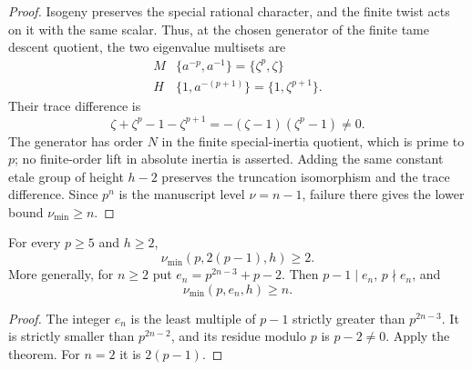 \begin{proof}
Isogeny preserves the special rational character, and the finite
twist acts on it with the same scalar.  Thus, at the chosen generator
of the finite tame descent quotient, the two eigenvalue multisets are
\[
 \begin{array}{c|c}
 M&\{a^{-p},a^{-1}\}=\{\zeta^p,\zeta\}\\
 H&\{1,a^{-(p+1)}\}=\{1,\zeta^{p+1}\}.
 \end{array}                                           \tag{B-RD62.14}
\]
Their trace difference is
\[
 \zeta+\zeta^p-1-\zeta^{p+1}
                  =-(\zeta-1)(\zeta^p-1)\ne0.
\]
The generator has order $N$ in the finite special-inertia quotient,
which is prime to $p$; no finite-order lift in absolute inertia is
asserted.  Adding the same constant etale group of height $h-2$
preserves the truncation isomorphism and the trace difference.
Since $p^n$ is the manuscript level $\nu=n-1$, failure there gives
the lower bound $\nu_{\min}\ge n$.
\end{proof}

\begin{corollary}
\label{cor:B-RD62}
For every $p\ge5$ and $h\ge2$,
\[
                      \nu_{\min}(p,2(p-1),h)\ge2.
                                                        \tag{B-RD62.15}
\]
More generally, for $n\ge2$ put $e_n=p^{2n-3}+p-2$.  Then
$p-1\mid e_n$, $p\nmid e_n$, and
\[
                         \nu_{\min}(p,e_n,h)\ge n.
                                                        \tag{B-RD62.16}
\]
\end{corollary}
\begin{proof}
The integer $e_n$ is the least multiple of $p-1$ strictly greater
than $p^{2n-3}$.  It is strictly smaller than $p^{2n-2}$, and its
residue modulo $p$ is $p-2\ne0$.  Apply the theorem.  For $n=2$
it is $2(p-1)$.
\end{proof}

